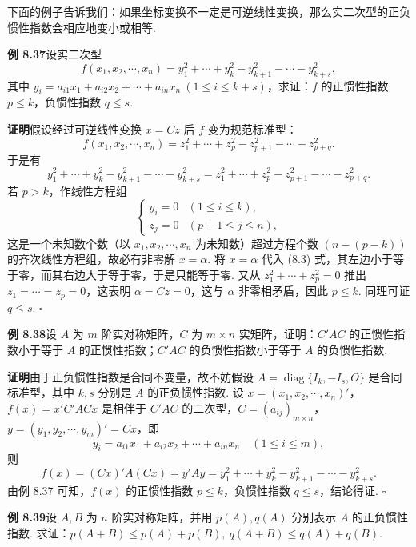 \documentclass[UTF8, 12pt, fontset=fandol, oneside]{ctexart}
\begin{document}
下面的例子告诉我们：如果坐标变换不一定是可逆线性变换，那么实二次型的正负惯性指数会相应地变小或相等.

\noindent\textbf{例 8.37}\quad 设实二次型
\[
f(x_1,x_2,\cdots,x_n)=y_1^2+\cdots+y_k^2-y_{k+1}^2-\cdots-y_{k+s}^2,
\]
其中 $y_i=a_{i1}x_1+a_{i2}x_2+\cdots+a_{in}x_n\ (1\le i\le k+s)$，求证：$f$ 的正惯性指数 $p\le k$，负惯性指数 $q\le s$.

\noindent\textbf{证明}\quad 假设经过可逆线性变换 $x=Cz$ 后 $f$ 变为规范标准型：
\[
f(x_1,x_2,\cdots,x_n)=z_1^2+\cdots+z_p^2-z_{p+1}^2-\cdots-z_{p+q}^2.
\]
于是有
\begin{equation}
y_1^2+\cdots+y_k^2-y_{k+1}^2-\cdots-y_{k+s}^2
=z_1^2+\cdots+z_p^2-z_{p+1}^2-\cdots-z_{p+q}^2.
\tag{8.3}
\end{equation}
若 $p>k$，作线性方程组
\[
\left\{\begin{array}{ll}
y_i=0 &(1\le i\le k),\\
z_j=0 &(p+1\le j\le n),
\end{array}\right.
\]
这是一个未知数个数（以 $x_1,x_2,\cdots,x_n$ 为未知数）超过方程个数 $(n-(p-k))$ 的齐次线性方程组，故必有非零解 $x=\alpha$. 将 $x=\alpha$ 代入 (8.3) 式，其左边小于等于零，而其右边大于等于零，于是只能等于零. 又从 $z_1^2+\cdots+z_p^2=0$ 推出 $z_1=\cdots=z_p=0$，这表明 $\alpha=Cz=0$，这与 $\alpha$ 非零相矛盾，因此 $p\le k$. 同理可证 $q\le s$. $\ensuremath{\square}$

\noindent\textbf{例 8.38}\quad 设 $A$ 为 $m$ 阶实对称矩阵，$C$ 为 $m\times n$ 实矩阵，证明：$C'AC$ 的正惯性指数小于等于 $A$ 的正惯性指数；$C'AC$ 的负惯性指数小于等于 $A$ 的负惯性指数.

\noindent\textbf{证明}\quad 由于正负惯性指数是合同不变量，故不妨假设 $A=\operatorname{diag}\{I_k,-I_s,O\}$ 是合同标准型，其中 $k,s$ 分别是 $A$ 的正负惯性指数. 设 $x=(x_1,x_2,\cdots,x_n)'$，$f(x)=x'C'ACx$ 是相伴于 $C'AC$ 的二次型，$C=(a_{ij})_{m\times n}$，$y=(y_1,y_2,\cdots,y_m)'=Cx$，即
\[
y_i=a_{i1}x_1+a_{i2}x_2+\cdots+a_{in}x_n\quad (1\le i\le m),
\]
则
\[
f(x)=(Cx)'A(Cx)=y'Ay=y_1^2+\cdots+y_k^2-y_{k+1}^2-\cdots-y_{k+s}^2.
\]
由例 8.37 可知，$f(x)$ 的正惯性指数 $p\le k$，负惯性指数 $q\le s$，结论得证. $\ensuremath{\square}$

\noindent\textbf{例 8.39}\quad 设 $A,B$ 为 $n$ 阶实对称矩阵，并用 $p(A),q(A)$ 分别表示 $A$ 的正负惯性指数. 求证：$p(A+B)\le p(A)+p(B),\ q(A+B)\le q(A)+q(B)$.
\end{document}
